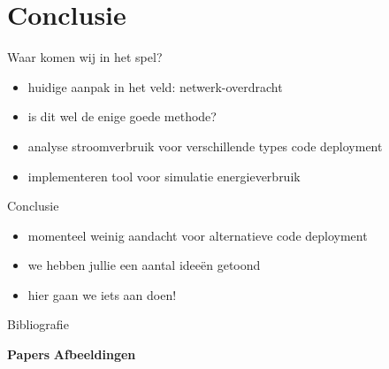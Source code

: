 \documentclass[presentation, bigger]{beamer}
\begin{document}
\section{Conclusie}
\label{sec-4}
\begin{frame}[label=sec-4-1]{Waar komen wij in het spel?}
  \begin{itemize}
  \item huidige aanpak in het veld: netwerk-overdracht
  \item is dit wel de enige goede methode?
  \item analyse stroomverbruik voor verschillende types code deployment
  \item implementeren tool voor simulatie energieverbruik
  \end{itemize}
\end{frame}

\begin{frame}[label=sec-4-2]{Conclusie}
  \begin{itemize}
  \item momenteel weinig aandacht voor alternatieve code deployment
  \item we hebben jullie een aantal idee\"en getoond 
  \item hier gaan we iets aan doen!
  \end{itemize}
\end{frame}
\begin{frame}[allowframebreaks]{Bibliografie}

  \nocite{*}
  \textbf{Papers}
  \printbibliography[category=papers]
  \newpage
  \textbf{Afbeeldingen}
  \printbibliography[type=misc]
\end{frame}

\end{document}
